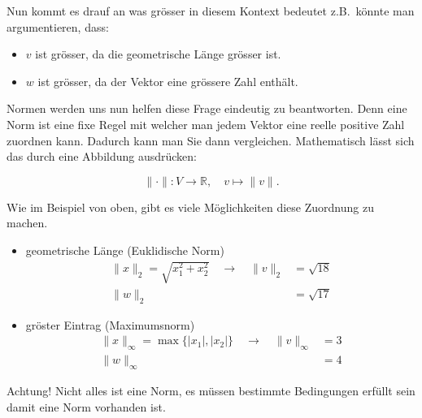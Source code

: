 \vspace{0.25\baselineskip}

Nun kommt es drauf an was grösser in diesem Kontext bedeutet z.B.\ könnte man argumentieren, dass:

\begin{itemize}
    \item \( v \) ist grösser, da die geometrische Länge grösser ist.
    \item \( w \) ist grösser, da der Vektor eine grössere Zahl enthält.
\end{itemize}

Normen werden uns nun helfen diese Frage eindeutig zu beantworten. Denn eine Norm ist eine fixe Regel mit welcher man jedem Vektor eine reelle positive Zahl zuordnen kann. Dadurch kann man Sie dann vergleichen. Mathematisch lässt sich das durch eine Abbildung ausdrücken:

\begin{equation*}
    \| {\cdot} \| : V \rightarrow \mathbb{R}, \quad v \mapsto \| v \|.
\end{equation*}

\vspace{0.25\baselineskip}

Wie im Beispiel von oben, gibt es viele Möglichkeiten diese Zuordnung zu machen. 

\begin{itemize}
    \item geometrische Länge (Euklidische Norm)
        \begin{equation*}
            \begin{aligned}
                \| x \|_2 = \sqrt{x_1^2 + x_2^2} \quad \to \quad \| v \|_2 &= \sqrt{18} \\
                \| w \|_2 &= \sqrt{17}
            \end{aligned}        
        \end{equation*}
    \item gröster Eintrag (Maximumsnorm)
        \begin{equation*}
            \begin{aligned}
                \| x \|_\infty = \max \{ |x_1|, |x_2| \} \quad \to \quad \| v \|_\infty &= 3 \\
                \| w \|_\infty &= 4
            \end{aligned}        
        \end{equation*}
\end{itemize}

Achtung! Nicht alles ist eine Norm, es müssen bestimmte Bedingungen erfüllt sein damit eine Norm vorhanden ist.


